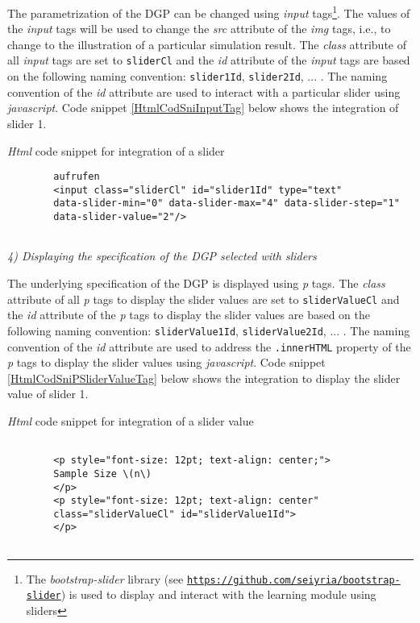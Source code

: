 \documentclass[12pt]{article}
\begin{document}
The parametrization of the DGP can be changed using \emph{input} tags\footnote{The \emph{bootstrap-slider} library (see \href{https://github.com/seiyria/bootstrap-slider}{\texttt{https://github.com/seiyria/bootstrap-slider}}) is used to display and interact with the learning module using sliders}. 
%
The values of the \emph{input} tags will be used to change the \emph{src} attribute of the \emph{img} tags, i.e., to change to the illustration of a particular simulation result. 
%
The \emph{class} attribute of all \emph{input} tags are set to \texttt{sliderCl} and the \emph{id} attribute of the \emph{input} tags are based on the following naming convention: \texttt{slider1Id}, \texttt{slider2Id}, ... . 
%
The naming convention of the \emph{id} attribute are used to interact with a particular slider using \emph{javascript}. 
%
Code snippet \ref{HtmlCodSniInputTag} below shows the integration of slider 1. 
%
\begin{CodeSnippet}[!hp]
	\centering
	\caption{\emph{Html} code snippet for integration of a slider}
	\footnotesize
	\vspace{0.25cm}
	\begin{BVerbatim}
		aufrufen
		<input class="sliderCl" id="slider1Id" type="text"
		data-slider-min="0" data-slider-max="4" data-slider-step="1"
		data-slider-value="2"/>
		
	\end{BVerbatim}
	\label{HtmlCodSniInputTag}
\end{CodeSnippet}


\vspace{1em}
\noindent\emph{4) Displaying the specification of the DGP selected with sliders}

The underlying specification of the DGP is displayed using \emph{p} tags. 
%
The \emph{class} attribute of all \emph{p} tags to display the slider values are set to \texttt{sliderValueCl} and the \emph{id} attribute of the \emph{p} tags to display the slider values are based on the following naming convention: \texttt{sliderValue1Id}, \texttt{sliderValue2Id}, ... . 
%
The naming convention of the \emph{id} attribute are used to address the \texttt{.innerHTML} property of the \emph{p} tags to display the slider values using \emph{javascript}. 
%
Code snippet \ref{HtmlCodSniPSliderValueTag} below shows the integration to display the slider value of slider 1. 
%
\begin{CodeSnippet}[!hp]
	\centering
	\caption{\emph{Html} code snippet for integration of a slider value}
	\footnotesize
	\vspace{0.25cm}
	\begin{BVerbatim}
		
		<p style="font-size: 12pt; text-align: center;">
		Sample Size \(n\)
		</p>
		<p style="font-size: 12pt; text-align: center"
		class="sliderValueCl" id="sliderValue1Id">
		</p>
		
	\end{BVerbatim}
	\label{HtmlCodSniPSliderValueTag}
\end{CodeSnippet}
\end{document}
